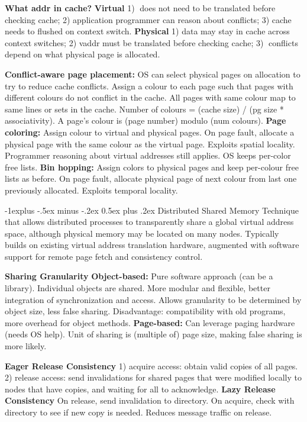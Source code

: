 \documentclass[6pt,landscape]{article}
\makeatletter
\renewcommand{\subsection}{\@startsection{subsection}{2}{0mm}%
                                {-1explus -.5ex minus -.2ex}%
                                {0.5ex plus .2ex}%
                                {\normalfont\normalsize\bfseries}}
\makeatother
\begin{document}
\begin{multicols}{3}
{\bf What addr in cache?} {\bf Virtual} 1) 􏱃does not need to be translated before checking cache; 2) application programmer can reason about conflicts; 3) cache needs to flushed on context switch. {\bf Physical} 1) data may stay in cache across context switches; 2) vaddr must be translated before checking cache; 3) 􏱄conflicts depend on what physical page is allocated.

{\bf Conflict-aware page placement:} OS can select physical pages on allocation to try to reduce cache conflicts. Assign a colour to each page such that pages with different colours do not conflict in the cache. All pages with same colour map to same lines or sets in the cache. Number of colours = (cache size) / (pg size * associativity). A page's colour is (page number) modulo (num colours).
{\bf Page coloring:} Assign colour to virtual and physical pages. On page fault, allocate a physical page with the same colour as the virtual page. Exploits spatial locality. Programmer reasoning about virtual addresses still applies. OS keeps per-color free lists.
{\bf Bin hopping:} Assign colors to physical pages and keep per-colour free lists as before. On page fault, allocate physical page of next colour from last one previously allocated. Exploits temporal locality.

\subsection{Distributed Shared Memory}
Technique that allows distributed processes to transparently 
share a global virtual address space, although physical memory may be located on many nodes. 
Typically builds on existing virtual address translation hardware, 
augmented with software support for remote page fetch and consistency control.

{\bf Sharing Granularity}
{\bf Object-based:} 
Pure software approach (can be a library). Individual objects are shared.
More modular and flexible, better integration of synchronization and access.
Allows granularity to be determined by object size, less false sharing.
Disadvantage: compatibility with old programs, more overhead for object methods.
{\bf Page-based:}
Can leverage paging hardware (needs OS help).
Unit of sharing is (multiple of) page size, making false sharing is more likely.

{\bf Eager Release Consistency} 
1) acquire access: obtain valid copies of all pages. 
2) release access: send invalidations for shared pages that were modified locally to nodes that have copies, and waiting for all to acknowledge.
{\bf Lazy Release Consistency} 
On release, send invalidation to directory.
On acquire, check with directory to see if new copy is needed.
Reduces message traffic on release.


\end{multicols}
\end{document}
